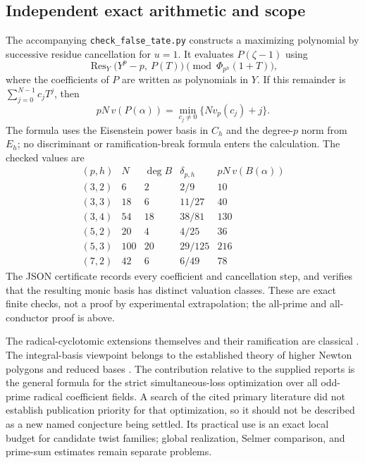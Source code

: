 \subsection{Independent exact arithmetic and scope}
The accompanying \texttt{check\_false\_tate.py} constructs a maximizing
polynomial by successive residue cancellation for $u=1$. It evaluates
$P(\zeta-1)$ using
\[
 \operatorname{Res}_{Y}\bigl(Y^p-p,\ P(T)\bigr)
       \pmod{\Phi_{p^h}(1+T)},
\]
where the coefficients of $P$ are written as polynomials in $Y$.
If this remainder is $\sum_{j=0}^{N-1}c_jT^j$, then
\[
 pN\,v(P(\alpha))=\min_{c_j\ne0}\{Nv_p(c_j)+j\}.
\]
The formula uses the Eisenstein power basis in $C_h$ and the degree-$p$
norm from $E_h$; no discriminant or ramification-break formula enters
the calculation. The checked values are
\[
\begin{array}{c|r|r|c|r}
(p,h)&N&\deg B&\delta_{p,h}&pN\,v(B(\alpha))\\\hline
(3,2)&6&2&2/9&10\\
(3,3)&18&6&11/27&40\\
(3,4)&54&18&38/81&130\\
(5,2)&20&4&4/25&36\\
(5,3)&100&20&29/125&216\\
(7,2)&42&6&6/49&78
\end{array}
\]
The JSON certificate records every coefficient and cancellation step,
and verifies that the resulting monic basis has distinct valuation
classes. These are exact finite checks, not a proof by experimental
extrapolation; the all-prime and all-conductor proof is above.

The radical-cyclotomic extensions themselves and their ramification
are classical \cite{Viviani,WangYuan}. The integral-basis viewpoint
belongs to the established theory of higher Newton polygons and
reduced bases \cite{GMN}. The contribution relative to the supplied
reports is the general formula for the strict simultaneous-loss
optimization over all odd-prime radical coefficient fields.
A search of the cited primary literature did not establish publication
priority for that optimization, so it should not be described as a
new named conjecture being settled. Its practical use is an exact
local budget for candidate twist families; global realization,
Selmer comparison, and prime-sum estimates remain separate problems.
